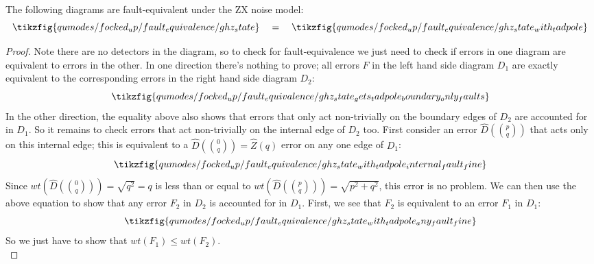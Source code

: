 \begin{proposition}\label{prop:tadpole_rule_fault_equiv}
    The following diagrams are fault-equivalent under the ZX noise model:
    \begin{equation}\label{eq:ghz_gets_tadpole}
    \tikzfig{qumodes/focked_up/fault_equivalence/ghz_state}
    \quad = \quad
    \tikzfig{qumodes/focked_up/fault_equivalence/ghz_state_with_tadpole}
    \end{equation}
    \begin{proof}
        Note there are no detectors in the diagram, so to check for fault-equivalence we just need to check if errors in one diagram are equivalent to errors in the other.
        In one direction there's nothing to prove; all errors $F$ in the left hand side diagram $D_1$ are exactly equivalent to the corresponding errors in the right hand side diagram $D_2$:
        \begin{equation}\label{eq:ghz_state_gets_tadpole_boundary_only_faults}
        \tikzfig{qumodes/focked_up/fault_equivalence/ghz_state_gets_tadpole_boundary_only_faults}
        \end{equation}
        In the other direction, the equality above also shows that errors that only act non-trivially on the boundary edges of $D_2$ are accounted for in $D_1$.
        So it remains to check errors that act non-trivially on the internal edge of $D_2$ too.
        First consider an error $\hat{D}(\binom{p}{q})$ that acts only on this internal edge; this is equivalent to a $\hat{D}(\binom{0}{q}) = \hat{Z}(q)$ error on any one edge of $D_1$:
        \begin{equation}\label{eq:ghz_state_with_tadpole_internal_fault_fine}
        \tikzfig{qumodes/focked_up/fault_equivalence/ghz_state_with_tadpole_internal_fault_fine}
        \end{equation}
        Since $wt(\hat{D}(\binom{0}{q})) = \sqrt{q^2} = q$ is less than or equal to $wt(\hat{D}(\binom{p}{q})) = \sqrt{p^2 + q^2}$, this error is no problem.
        We can then use the above equation to show that any error $F_2$ in $D_2$ is accounted for in $D_1$.
        First, we see that $F_2$ is equivalent to an error $F_1$ in $D_1$:
        \begin{equation}\label{eq:ghz_state_with_tadpole_any_fault_fine}
        \tikzfig{qumodes/focked_up/fault_equivalence/ghz_state_with_tadpole_any_fault_fine}
        \end{equation}
        So we just have to show that $wt(F_1) \leq wt(F_2)$.
        \begin{equation}\label{eq:ghz_state_with_tadpole_any_fault_fine_inequality}

\end{equation}
\end{proof}
\end{proposition}
